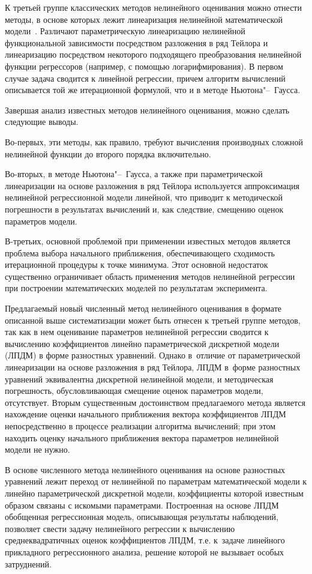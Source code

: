К третьей группе классических методов нелинейного оценивания можно отнести методы, в основе которых лежит линеаризация нелинейной математической модели~\cite{zot:3}. 
Различают параметрическую линеаризацию нелинейной функциональной зависимости посредством разложения в ряд Тейлора и линеаризацию посредством некоторого подходящего преобразования нелинейной функции регрессоров (например, с помощью логарифмирования). В первом случае задача сводится к линейной регрессии, причем алгоритм вычислений описывается той же итерационной формулой, что и в методе Ньютона"--~Гаусса. 

Завершая анализ известных методов нелинейного оценивания, можно сделать следующие выводы. 

Во-первых, эти методы, как правило, требуют вычисления производных сложной нелинейной функции до второго порядка включительно. 

Во-вторых, в методе Ньютона"--~Гаусса, а также при параметрической линеаризации на основе разложения в ряд Тейлора используется аппроксимация нелинейной регрессионной модели линейной, что приводит к методической погрешности в результатах вычислений и, как следствие, смещению оценок параметров модели. 

В-третьих, основной проблемой при применении известных методов является проблема выбора начального приближения, обеспечивающего сходимость итерационной процедуры к точке минимума. Этот основной недостаток существенно ограничивает область применения методов нелинейной регрессии при построении математических моделей по результатам эксперимента.

Предлагаемый новый численный метод нелинейного оценивания в формате описанной выше систематизации может быть отнесен к третьей группе методов, так как в нем оценивание параметров нелинейной регрессии сводится к вычислению коэффициентов линейно параметрической дискретной модели (ЛПДМ) в форме разностных уравнений. 
Однако в~отличие от параметрической линеаризации на основе разложения в ряд Тейлора, ЛПДМ в~форме разностных уравнений эквивалентна дискретной нелинейной модели, и методическая погрешность, обусловливающая смещение оценок параметров модели, отсутствует. 
Вторым существенным достоинством предлагаемого метода является нахождение оценки начального приближения вектора коэффициентов ЛПДМ непосредственно в процессе реализации алгоритма вычислений; при этом находить оценку начального приближения вектора параметров нелинейной модели не нужно.

В основе численного метода нелинейного оценивания на основе разностных уравнений лежит переход от нелинейной по параметрам математической модели к линейно параметрической дискретной модели, коэффициенты которой известным образом связаны с искомыми параметрами. Построенная на основе ЛПДМ обобщенная регрессионная модель, описывающая результаты наблюдений, позволяет свести задачу нелинейного регрессии к вычислению среднеквадратичных оценок коэффициентов ЛПДМ, т.е. к~задаче линейного прикладного регрессионного анализа, решение которой не вызывает особых затруднений.

